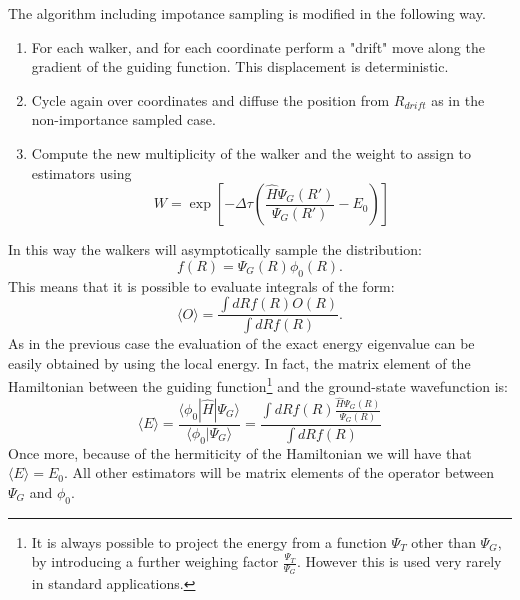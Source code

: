 The algorithm including impotance sampling is modified in the following way.
\begin{enumerate}
\item
   For each walker, and for each coordinate perform a "drift" move along the
   gradient of the guiding function. This displacement is deterministic.
 	\begin{algorithmic} 
 		\EndFor
 		\EndFor
 	\end{algorithmic}
\item
Cycle again over coordinates and diffuse the position from $R_{drift}$ as in the non-importance sampled case.
\item
Compute the new multiplicity of the walker and the weight to assign to estimators using
\begin{equation}
W=\exp\left[-\Delta\tau\left(\frac{\hat{H}\Psi_G(R')}{\Psi_G(R')}-E_0\right)\right]
\end{equation}
\end{enumerate}
In this way the walkers will asymptotically sample the distribution:
\begin{equation}
f(R)=\Psi_G(R)\phi_0(R).
\end{equation}
This means that it is possible to evaluate integrals of the form:
\begin{equation}
\langle O\rangle=\frac{\int dR f(R) O(R)}{\int dR f(R)}.
\end{equation}
As in the previous case the evaluation of the exact energy eigenvalue can be easily obtained by using the local energy. In fact, the matrix element of the Hamiltonian between the guiding function\footnote{It is always possible to project the energy from a function $\Psi_T$ other than $\Psi_G$, by introducing a further weighing factor $\frac{\Psi_T}{\Psi_G}$. However this is used very rarely in standard applications.}  and the ground-state wavefunction is:  
\begin{equation}
\langle E\rangle =\frac{\langle \phi_0|\hat{H}|\Psi_G\rangle}{\langle \phi_0|\Psi_G\rangle}=\frac{\int dR f(R)\frac{\hat{H}\Psi_G(R)}{\Psi_G(R)}}{\int dR f(R)}
\end{equation}
Once more, because of the hermiticity of the Hamiltonian we will have that $\langle E\rangle =E_0$. All other estimators will be matrix elements of the operator between $\Psi_G$ and $\phi_0$. 

